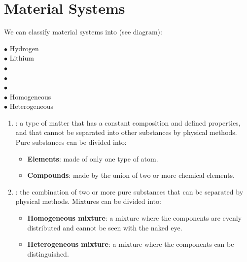 

\section{Material Systems}
We can classify material systems into (see diagram):
\vspace{12pt}

{
{
{\( \bullet \) Hydrogen
\vspace{6pt}\\
    \( \bullet \) Lithium}
\vspace{20pt}\\
{\( \bullet \)
\vspace{6pt}\\
    \( \bullet \)
\vspace{6pt}\\
    \( \bullet \)}
}
\vspace{20pt} \\
{\( \bullet \) Homogeneous
\vspace{6pt}\\
    \( \bullet \) Heterogeneous
}
}

\begin{enumerate}[label=\numberballmDarkTeal]
\item {}: a type of matter that has a constant composition and defined properties, and that cannot be separated into other substances by physical methods.
Pure substances can be divided into:
\begin{itemize}
    \item \textbf{Elements}: made of only one type of atom.
    \item \textbf{Compounds}: made by the union of two or more chemical elements.
\end{itemize}

\item {}: the combination of two or more pure substances that can be separated by physical methods.
Mixtures can be divided into:
\begin{itemize}
    \item \textbf{Homogeneous mixture}: a mixture where the components are evenly distributed and cannot be seen with the naked eye.
    \item \textbf{Heterogeneous mixture}: a mixture where the components can be distinguished.
\end{itemize}

\end{enumerate}


